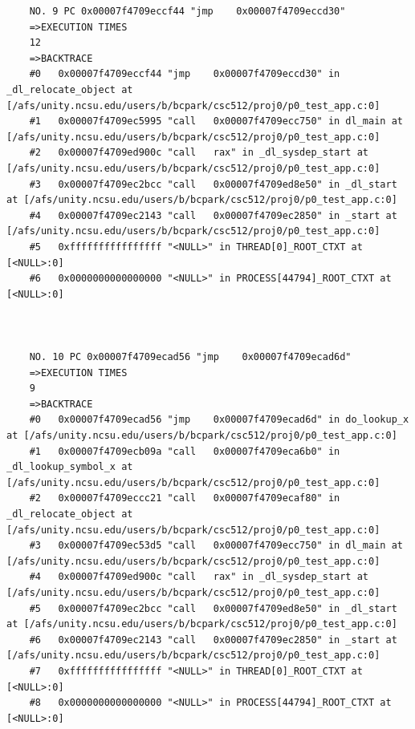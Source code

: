 \documentclass[11pt]{article}
\begin{document}
\begin{verbatim}
    NO. 9 PC 0x00007f4709eccf44 "jmp    0x00007f4709eccd30"
    =>EXECUTION TIMES
    12
    =>BACKTRACE
    #0   0x00007f4709eccf44 "jmp    0x00007f4709eccd30" in _dl_relocate_object at [/afs/unity.ncsu.edu/users/b/bcpark/csc512/proj0/p0_test_app.c:0]
    #1   0x00007f4709ec5995 "call   0x00007f4709ecc750" in dl_main at [/afs/unity.ncsu.edu/users/b/bcpark/csc512/proj0/p0_test_app.c:0]
    #2   0x00007f4709ed900c "call   rax" in _dl_sysdep_start at [/afs/unity.ncsu.edu/users/b/bcpark/csc512/proj0/p0_test_app.c:0]
    #3   0x00007f4709ec2bcc "call   0x00007f4709ed8e50" in _dl_start at [/afs/unity.ncsu.edu/users/b/bcpark/csc512/proj0/p0_test_app.c:0]
    #4   0x00007f4709ec2143 "call   0x00007f4709ec2850" in _start at [/afs/unity.ncsu.edu/users/b/bcpark/csc512/proj0/p0_test_app.c:0]
    #5   0xffffffffffffffff "<NULL>" in THREAD[0]_ROOT_CTXT at [<NULL>:0]
    #6   0x0000000000000000 "<NULL>" in PROCESS[44794]_ROOT_CTXT at [<NULL>:0]
    
    
    
    NO. 10 PC 0x00007f4709ecad56 "jmp    0x00007f4709ecad6d"
    =>EXECUTION TIMES
    9
    =>BACKTRACE
    #0   0x00007f4709ecad56 "jmp    0x00007f4709ecad6d" in do_lookup_x at [/afs/unity.ncsu.edu/users/b/bcpark/csc512/proj0/p0_test_app.c:0]
    #1   0x00007f4709ecb09a "call   0x00007f4709eca6b0" in _dl_lookup_symbol_x at [/afs/unity.ncsu.edu/users/b/bcpark/csc512/proj0/p0_test_app.c:0]
    #2   0x00007f4709eccc21 "call   0x00007f4709ecaf80" in _dl_relocate_object at [/afs/unity.ncsu.edu/users/b/bcpark/csc512/proj0/p0_test_app.c:0]
    #3   0x00007f4709ec53d5 "call   0x00007f4709ecc750" in dl_main at [/afs/unity.ncsu.edu/users/b/bcpark/csc512/proj0/p0_test_app.c:0]
    #4   0x00007f4709ed900c "call   rax" in _dl_sysdep_start at [/afs/unity.ncsu.edu/users/b/bcpark/csc512/proj0/p0_test_app.c:0]
    #5   0x00007f4709ec2bcc "call   0x00007f4709ed8e50" in _dl_start at [/afs/unity.ncsu.edu/users/b/bcpark/csc512/proj0/p0_test_app.c:0]
    #6   0x00007f4709ec2143 "call   0x00007f4709ec2850" in _start at [/afs/unity.ncsu.edu/users/b/bcpark/csc512/proj0/p0_test_app.c:0]
    #7   0xffffffffffffffff "<NULL>" in THREAD[0]_ROOT_CTXT at [<NULL>:0]
    #8   0x0000000000000000 "<NULL>" in PROCESS[44794]_ROOT_CTXT at [<NULL>:0]
\end{verbatim}
\end{document}
